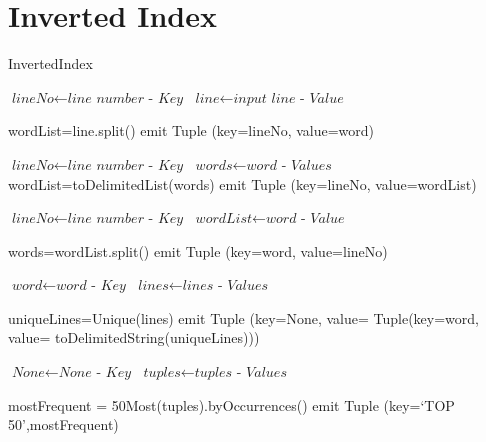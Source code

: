 \documentclass[journal,10pt]{IEEEtran}
\begin{document}
\section*{Inverted Index}

\begin{algorithm}
\caption{InvertedIndex}\label{euclid}
\begin{algorithmic}[1]





\State $\textit{lineNo} \gets \textit{line number - Key} $
\State $\textit{line} \gets \textit{input line - Value }$



\State wordList=line.split()
\State emit Tuple (key=lineNo, value=word)
\EndIf
\EndFor
\EndProcedure



\State $\textit{lineNo} \gets \textit{line number - Key} $
\State $\textit{words} \gets \textit{word - Values}$
\State wordList=toDelimitedList(words)
\State emit Tuple (key=lineNo, value=wordList)
\EndProcedure

\State $\textit{lineNo} \gets \textit{line number - Key} $
\State $\textit{wordList} \gets \textit{word - Value}$

\State words=wordList.split()
\State emit Tuple (key=word, value=lineNo)
\EndFor
\EndProcedure


\State $\textit{word} \gets \textit{word - Key} $
\State $\textit{lines} \gets \textit{lines - Values}$

\State uniqueLines=Unique(lines)
\State emit Tuple (key=None, value= Tuple(key=word, value= toDelimitedString(uniqueLines)))

\EndProcedure


\State $\textit{None} \gets \textit{None - Key} $
\State $\textit{tuples} \gets \textit{tuples - Values}$

\State mostFrequent = 50Most(tuples).byOccurrences()
\State emit Tuple (key=`TOP 50',mostFrequent)

\EndProcedure


\end{algorithmic}
\end{algorithm}


\clearpage
\end{document}
